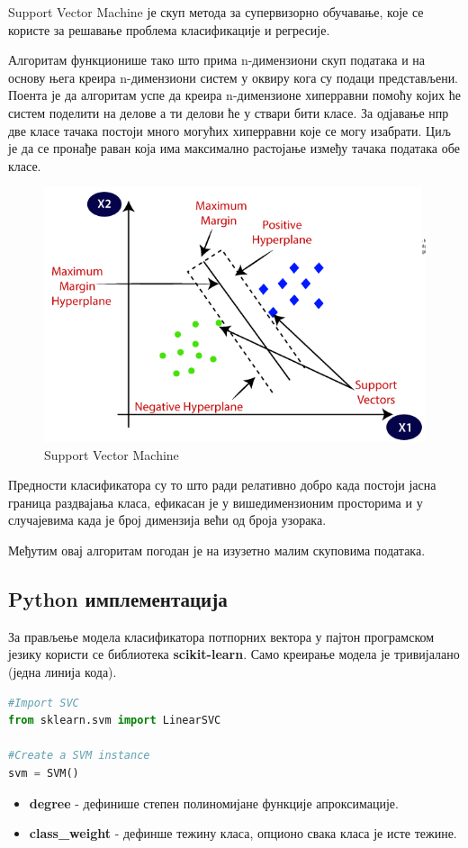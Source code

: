 \documentclass[11pt]{article} %
\begin{document}
Support Vector Machine је скуп метода за супервизорно обучавање, које се
користе за решавање проблема класификације и регресије.

Алгоритам функционише тако што прима n-димензиони скуп података и на
основу њега креира n-димензиони систем у оквиру кога су подаци представљени.
Поента је да алгоритам успе да креира n-димензионе хиперравни помоћу којих ће
систем поделити на делове а ти делови ће у ствари бити класе. За одјавање нпр две
класе тачака постоји много могућих хиперравни које се могу изабрати. Циљ је да се
пронађе раван која има максимално растојање између тачака података обе класе.

\begin{figure}[h]
\centering
	\includegraphics[scale=0.5]{support-vector-machine-algorithm}
	\caption{Support Vector Machine} 
\end{figure}

Предности класификатора су то што ради релативно добро када постоји јасна
граница раздвајања класа, ефикасан је у вишедимензионим просторима и у
случајевима када је број димензија већи од броја узорака.

Међутим овај алгоритам погодан је на изузетно малим скуповима података.
\subsection{Python имплементација}

За прављење модела класификатора потпорних вектора у пајтон програмском језику користи се библиотека \textbf{scikit-learn}. Само креирање модела је тривијалано (једна линија кода).

\begin{lstlisting}[language=Python,title=Пример 3. Класификатор Метода потпорних вектора]
#Import SVC
from sklearn.svm import LinearSVC

#Create a SVM instance
svm = SVM()
\end{lstlisting}
\begin{itemize}
	\item \textbf{degree} - дефинише степен полиномијане функције апроксимације.
	\item \textbf{class\_weight} - дефинше тежину класа, опционо свака класа је исте тежине.
\end{itemize}
\end{document}
